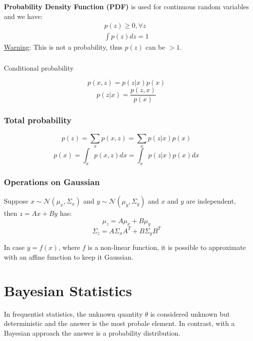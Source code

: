 \textbf{Probability Density Function (PDF)} is used for continuous random variables and we have:
\begin{equation}
    \begin{split}
        p(z) \ge 0 ,\forall z \\
        \int p(z) dz = 1
    \end{split}
\end{equation}
\underline{Warning}: This is not a probability, thus $p(z)$ can be $>1$.

\subsubsection{}{Conditional probability}

\begin{equation}
    p(x, z) = p(z|x)p(x)
\end{equation}
\begin{equation}
    p(z|x) = \frac{p(z, x)}{p(x)}
\end{equation}

\subsubsection{Total probability}
\begin{equation}
    p(z) = \sum_{x} p(x, z) = \sum_{x} p(z|x)p(x)
\end{equation}
\begin{equation}
    p(x) = \int_x p(x, z)dx = \int_x p(z|x)p(x)dx
\end{equation}

\subsubsection{Operations on Gaussian}
Suppose $x \sim \mathcal{N}(\mu_x, \Sigma_x)$ and $y \sim \mathcal{N}(\mu_y, \Sigma_y)$ and $x$ and $y$ are independent, then $z = Ax+By$ has:
\begin{equation}
    \mu_z = A\mu_x + B\mu_y
\end{equation}
\begin{equation}
    \Sigma_z = A \Sigma_x A^T + B \Sigma_y B^T
\end{equation}

In case $y=f(x)$, where $f$ is a non-linear function, it is possible to approximate with an affine function to keep it Gaussian.

\section{Bayesian Statistics}
In frequentist statistics, the unknown quantity $\theta$ is considered unknown but deterministic and the answer is the most probale element. In contrast, with a Bayesian approach the answer is a probability distribution.

